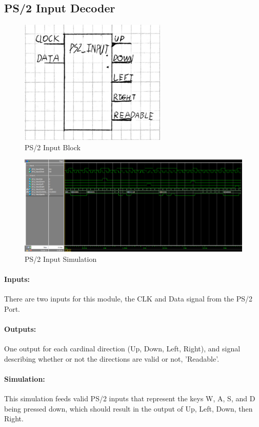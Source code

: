 \documentclass[]{article}
\begin{document}
\subsection{PS/2 Input Decoder}
\begin{figure}[H]\centering
    \includegraphics[width=0.5\linewidth]{figures/PS2_Input_Block.png}
    \caption{PS/2 Input Block}
    \label{fig:ps2InputBlock}
\end{figure}
\begin{figure}[H]\centering
    \includegraphics[width=\linewidth]{figures/PS2_Input_Sim.png}
    \caption{PS/2 Input Simulation}
    \label{fig:ps2ParserSim}
\end{figure}
\paragraph{Inputs:} There are two inputs for this module, the CLK and Data signal from the PS/2 Port.
\paragraph{Outputs:} One output for each cardinal direction (Up, Down, Left, Right), and signal describing whether or not the directions are valid or not, 'Readable'.
\paragraph{Simulation:} This simulation feeds valid PS/2 inputs that represent the keys W, A, S, and D being pressed down, which should result in the output of Up, Left, Down, then Right.
\end{document}

